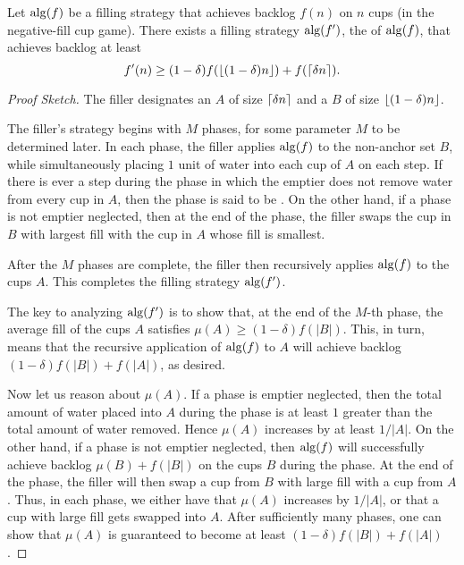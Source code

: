 \begin{lemma}
  Let $\operatorname{\text{\textup{alg}}}(f)$ be a filling strategy that achieves backlog
  $f(n)$ on $n$ cups (in the negative-fill cup game). There
  exists a filling strategy $\operatorname{\text{\textup{alg}}}(f')$,
  the  of $\operatorname{\text{\textup{alg}}}(f)$, that achieves backlog at
  least $$f'(n) \ge (1-\delta) f(\left\lfloor (1-\delta)n \right\rfloor) +
  f(\left\lceil \delta n \right\rceil).$$
\end{lemma}
\begin{proof}[Proof Sketch]
The filler designates an  $A$ of size
$\left\lceil \delta n \right\rceil$ and a  $B$ of size
$\left\lfloor (1-\delta)n \right\rfloor$.

The filler's strategy begins with $M$ phases, for some parameter $M$
to be determined later. In each phase,
the filler applies $\operatorname{\text{\textup{alg}}}(f)$ to the non-anchor set $B$, while
simultaneously placing $1$ unit of water into each cup of $A$ on each
step. If there is ever a step during the phase in which the emptier
does not remove water from every cup in $A$, then the phase is said to
be . On the other hand, if a phase is not
emptier neglected, then at the end of the phase, the filler swaps the
cup in $B$ with largest fill with the cup in $A$ whose fill is
smallest.

After the $M$ phases are complete, the filler then recursively
applies $\operatorname{\text{\textup{alg}}}(f)$ to the cups $A$. This completes the filling strategy
$\operatorname{\text{\textup{alg}}}(f')$.

The key to analyzing $\operatorname{\text{\textup{alg}}}(f')$ is to show that, at the end of the
$M$-th phase, the average fill of the cups $A$ satisfies
$\mu(A) \ge (1 - \delta) f(|B|)$. This, in turn, means that the
recursive application of $\operatorname{\text{\textup{alg}}}(f)$ to $A$ will achieve backlog
$(1 - \delta) f(|B|) + f(|A|)$, as desired.

Now let us reason about $\mu(A)$. If a phase is emptier neglected,
then the total amount of water placed into $A$ during the phase is at
least $1$ greater than the total amount of water removed. Hence
$\mu(A)$ increases by at least $1/|A|$. On the other hand, if a phase
is not emptier neglected, then $\operatorname{\text{\textup{alg}}}(f)$ will successfully achieve
backlog $\mu(B) + f(|B|)$ on the cups $B$ during the phase. At the end
of the phase, the filler will then swap a cup from $B$ with large fill
with a cup from $A$. Thus, in each phase, we either have that $\mu(A)$
increases by $1 / |A|$, or that a cup with large fill gets swapped
into $A$. After sufficiently many phases, one can show that $\mu(A)$
is guaranteed to become at least $(1 - \delta)f(|B|) + f(|A|)$.




\end{proof}
